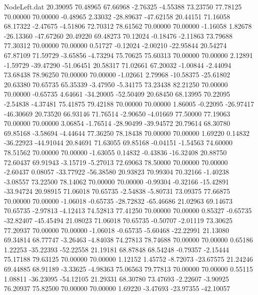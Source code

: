 \begin{filecontents}{NodeLeft.dat}
  20.39095   70.48965   67.66968    -2.76325   -4.55388   73.23750   77.78125   70.00000   70.00000   -0.48965    2.33032  -28.89637  -47.62158
  20.44151   71.16058   68.17322    -2.47675   -4.51806   72.70312   78.61562   70.00000   70.00000   -1.16058    1.82678  -26.13360  -47.67260
  20.49220   69.48273   70.12024    -0.18476   -2.11863   73.79688   77.30312   70.00000   70.00000    0.51727   -0.12024   -2.00210  -22.95844
  20.54274   67.87109   71.59729    -3.65856   -4.73294   75.70625   75.60313   70.00000   70.00000    2.12891   -1.59729  -39.47290  -51.06451
  20.58317   71.02661   67.20032    -1.00844   -2.44094   73.68438   78.96250   70.00000   70.00000   -1.02661    2.79968  -10.58375  -25.61802
  20.63380   70.65735   65.35339    -3.47950   -5.34175   73.23438   82.21250   70.00000   70.00000   -0.65735    4.64661  -34.20005  -52.50409
  20.68450   68.13995   70.22095    -2.54838   -4.37481   75.41875   79.42188   70.00000   70.00000    1.86005   -0.22095  -26.97417  -46.30669
  20.73520   66.93146   71.76514    -2.90650   -4.01669   77.50000   77.19063   70.00000   70.00000    3.06854   -1.76514  -28.90499  -39.94572
  20.79614   68.30780   69.85168    -3.58694   -4.44644   77.36250   78.18438   70.00000   70.00000    1.69220    0.14832  -36.22923  -44.91044
  20.84691   71.63055   69.85168    -0.04151   -1.54563   74.60000   78.51562   70.00000   70.00000   -1.63055    0.14832   -0.43836  -16.32408
  20.88750   72.60437   69.91943    -3.15719   -5.27013   72.69063   78.50000   70.00000   70.00000   -2.60437    0.08057  -33.77922  -56.38580
  20.93823   70.99304   70.32166    -1.40238   -3.08557   73.22500   78.14062   70.00000   70.00000   -0.99304   -0.32166  -15.42891  -33.94724
  20.98915   71.06018   70.65735    -2.54838   -5.80731   73.09375   77.66875   70.00000   70.00000   -1.06018   -0.65735  -28.72832  -65.46686
  21.02963   69.14673   70.65735    -2.97813   -4.12413   74.52813   77.41250   70.00000   70.00000    0.85327   -0.65735  -32.82407  -45.45494
  21.08023   71.06018   70.65735    -0.50707   -2.01119   73.30625   77.20937   70.00000   70.00000   -1.06018   -0.65735   -5.60468  -22.22991
  21.13080   69.34814   68.77747    -3.26463   -4.84038   74.27813   78.74688   70.00000   70.00000    0.65186    1.22253  -35.22393  -52.22558
  21.19181   68.87848   68.54248    -0.79357   -2.15444   75.17188   79.63125   70.00000   70.00000    1.12152    1.45752   -8.72073  -23.67575
  21.24246   69.44885   68.91189    -3.33625   -4.98363   75.06563   79.77813   70.00000   70.00000    0.55115    1.08811  -36.23095  -54.12105
  21.29331   68.30780   73.47693    -2.22607   -3.90925   76.20937   75.82500   70.00000   70.00000    1.69220   -3.47693  -23.97355  -42.10057

\end{filecontents}
